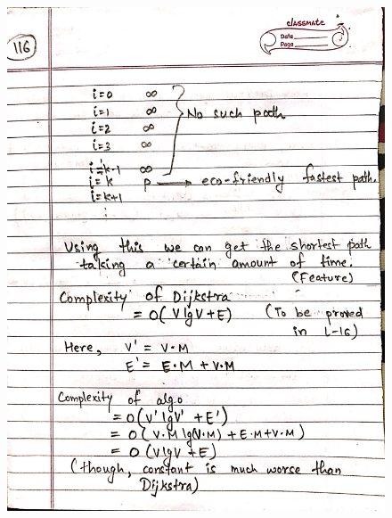 \begin{figure}[H]
    \centering
    \includegraphics[scale=0.25]{"./MIT 6.006/MIT_6006_116"}
\end{figure}
\newpage
